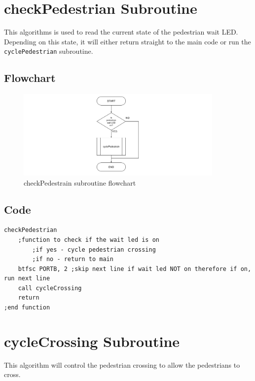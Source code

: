 \section{checkPedestrian Subroutine}
This algorithms is used to read the current state of the pedestrian wait LED. Depending on this state, it will either return straight to the main code or run the \verb|cyclePedestrian| subroutine.

\subsection*{Flowchart}
\begin{figure}[H]
    \centering
    \includegraphics[width=0.9\textwidth]{images/flowchart-checkPedestrian.png}
    \caption{checkPedestrain subroutine flowchart}
    \label{fig:flowchart-chechPedestrian}
\end{figure}
\subsection*{Code}
\begin{lstlisting}[language={[x86masm]Assembler}, style=assembly, caption=checkPedestrian subroutine]
checkPedestrian
	;function to check if the wait led is on
		;if yes - cycle pedestrian crossing
		;if no - return to main 
	btfsc PORTB, 2 ;skip next line if wait led NOT on therefore if on, run next line
	call cycleCrossing
	return
;end function
\end{lstlisting}

\section{cycleCrossing Subroutine}
This algorithm will control the pedestrian crossing to allow the pedestrians to cross. 
